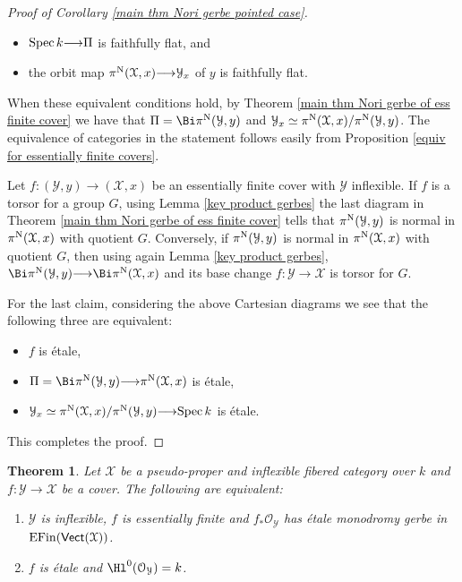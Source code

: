 \documentclass[12pt,reqno]{amsart}
\theoremstyle{plain}
\newtheorem{thm}{Theorem}[section]
\theoremstyle{definition}
\numberwithin{thm}{section}
\newcounter{x}\setcounter{x}{1}
\theoremstyle{plain}
\begin{document}
\begin{proof}[Proof of Corollary \ref{main thm Nori gerbe pointed case}]
\begin{itemize}
\item ${{\rm Spec \,}} k {\longrightarrow} \Pi$ is faithfully flat, and

\item the orbit map $\pi^{\textup{N}}({\mathcal{X}},x){\longrightarrow} {\mathcal{Y}}_x$ of $y$ is faithfully flat.
\end{itemize}
When these equivalent conditions hold, by Theorem \ref{main thm Nori gerbe of ess finite cover} we
have that $\Pi=\Bi\pi^{\textup{N}}({\mathcal{Y}},y)$ and ${\mathcal{Y}}_x \simeq \pi^{\textup{N}}({\mathcal{X}},x)/\pi^{\textup{N}}({\mathcal{Y}},y)$. The equivalence of categories in the statement follows
easily from Proposition \ref{equiv for essentially finite covers}.

Let $f\colon ({\mathcal{Y}},y){\longrightarrow} ({\mathcal{X}},x)$ be an essentially finite cover with ${\mathcal{Y}}$ inflexible. If $f$ is
a torsor for a group $G$, using Lemma \ref{key product gerbes} the last diagram in Theorem
\ref{main thm Nori gerbe of ess finite cover} tells that $\pi^{\textup{N}}({\mathcal{Y}},y)$ is normal in
$\pi^{\textup{N}}({\mathcal{X}},x)$ with quotient $G$.
Conversely, if $\pi^{\textup{N}}({\mathcal{Y}},y)$ is normal in $\pi^{\textup{N}}({\mathcal{X}},x)$ with quotient $G$, then using again
Lemma \ref{key product gerbes}, $\Bi \pi^{\textup{N}}({\mathcal{Y}},y) {\longrightarrow} \Bi \pi^{\textup{N}}({\mathcal{X}},x)$ and its base change
$f\colon {\mathcal{Y}}{\longrightarrow} {\mathcal{X}}$ is torsor for $G$.

For the last claim, considering the above Cartesian diagrams we see that the following three are
equivalent:
\begin{itemize}
\item $f$ is \'etale,

\item $\Pi=\Bi \pi^{\textup{N}}({\mathcal{Y}},y){\longrightarrow} \pi^{\textup{N}}({\mathcal{X}},x)$ is \'etale,

\item ${\mathcal{Y}}_x\simeq \pi^{\textup{N}}({\mathcal{X}},x)/\pi^{\textup{N}}({\mathcal{Y}},y){\longrightarrow} {{\rm Spec \,}} k$ is \'etale.
\end{itemize}
This completes the proof. 
\end{proof}

\begin{thm}\label{main thm ess finite etale}
 Let ${\mathcal{X}}$ be a pseudo-proper and inflexible fibered category over $k$ and $f\colon{\mathcal{Y}}{\longrightarrow}{\mathcal{X}}$ be a cover. The following are equivalent:
 \begin{enumerate}
  \item ${\mathcal{Y}}$ is inflexible, $f$ is essentially finite and $f_*{\mathcal{O}_{\mathcal{Y}}}$ has \'etale monodromy gerbe in ${{\rm EFin}}({\text{\sf Vect}}({\mathcal{X}}))$.
  \item $f$ is \'etale and $\Hl^0({\mathcal{O}_{\mathcal{Y}}})=k$.
 \end{enumerate}
\end{thm}
\end{document}
